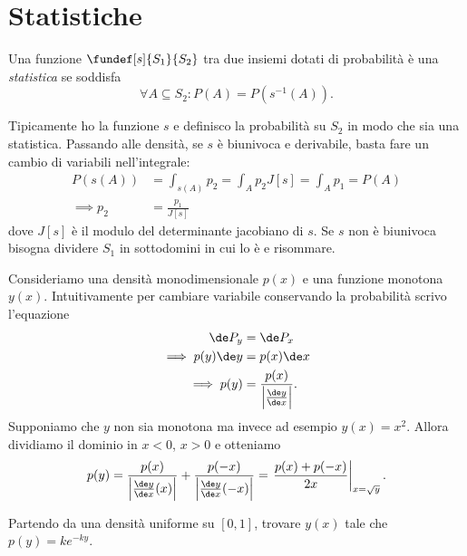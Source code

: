 \section{Statistiche}

\begin{definition}[Statistica]
	Una funzione $\fundef[s]{S_1}{S_2}$ tra due insiemi dotati di probabilità è una \emph{statistica} se soddisfa
	\begin{equation*}
		\forall A\subseteq S_2 : P(A) = P(s^{-1}(A)).
	\end{equation*}
\end{definition}

Tipicamente ho la funzione $s$ e definisco la probabilità su $S_2$ in modo che sia una statistica.
Passando alle densità, se $s$ è biunivoca e derivabile, basta fare un cambio di variabili nell'integrale:
\begin{align*}
	P(s(A)) &= \int_{s(A)} p_2 = \int_A p_2 J[s] = \int_A p_1 = P(A) \\
	\implies p_2 &= \frac{p_1}{J[s]}
\end{align*}
dove $J[s]$ è il modulo del determinante jacobiano di $s$.
Se $s$ non è biunivoca bisogna dividere $S_1$ in sottodomini in cui lo è e risommare.

\begin{example}
	\label{th:stat1d}
	Consideriamo una densità monodimensionale $p(x)$ e una funzione monotona $y(x)$.
	Intuitivamente per cambiare variabile conservando la probabilità scrivo l'equazione
	\begin{align*}
		\de P_y &= \de P_x \\
		\implies p(y)\de y &= p(x) \de x \\
		\implies p(y) &= \frac{p(x)}{\left|\frac{\de y}{\de x}\right|}.
	\end{align*}
	Supponiamo che $y$ non sia monotona ma invece ad esempio $y(x)=x^2$.
	Allora dividiamo il dominio in $x<0$, $x>0$ e otteniamo
	\begin{equation*}
		p(y) = \frac{p(x)}{\left|\frac{\de y}{\de x}(x)\right|} + \frac{p(-x)}{\left|\frac{\de y}{\de x}(-x)\right|} =
		\left.\frac{p(x)+p(-x)}{2x}\right|_{x=\sqrt y}.
	\end{equation*}
\end{example}

\begin{exercise}
	Partendo da una densità uniforme su $[0,1]$,
	trovare $y(x)$ tale che $p(y) = ke^{-ky}$.
\end{exercise}


